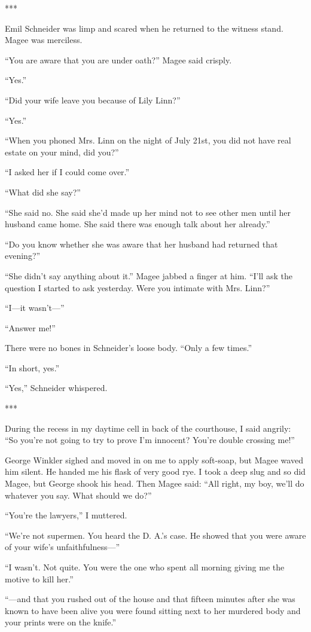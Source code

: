 \documentclass{novel}
\begin{document}
{***

Emil Schneider was limp and scared when he returned to the witness stand. Magee was merciless.

“You are aware that you are under oath?” Magee said crisply.

“Yes.”

“Did your wife leave you because of Lily Linn?”

“Yes.”

“When you phoned Mrs. Linn on the night of July 21st, you did not have real estate on your mind, did you?”

“I asked her if I could come over.”

“What did she say?”

“She said no. She said she’d made up her mind not to see other men until her husband came home. She said there was enough talk about her already.”

“Do you know whether she was aware that her husband had returned that evening?”

“She didn’t say anything about it.” Magee jabbed a finger at him. “I’ll ask the question I started to ask yesterday. Were you intimate with Mrs. Linn?”

“I—it wasn’t—”

“Answer me!”

There were no bones in Schneider’s loose body. “Only a few times.”

“In short, yes.”

“Yes,” Schneider whispered.

***

During the recess in my daytime cell in back of the courthouse, I said angrily: “So you’re not going to try to prove I’m innocent? You’re double crossing me!”

George Winkler sighed and moved in on me to apply soft-soap, but Magee waved him silent. He handed me his flask of very good rye. I took a deep slug and so did Magee, but George shook his head. Then Magee said: “All right, my boy, we’ll do whatever you say. What should we do?”

“You’re the lawyers,” I muttered.

“We’re not supermen. You heard the D. A.’s case. He showed that you were aware of your wife’s unfaithfulness—”

“I wasn’t. Not quite. You were the one who spent all morning giving me the motive to kill her.”

“—and that you rushed out of the house and that fifteen minutes after she was known to have been alive you were found sitting next to her murdered body and your prints were on the knife.”

}
\end{document}

